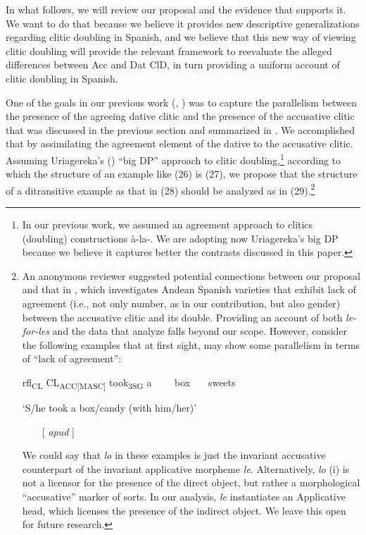\documentclass[output=paper,colorlinks,citecolor=brown,
]{langscibook}
\begin{document}
In what follows, we will review our proposal and the evidence that supports it. We want to do that because we believe it provides new descriptive generalizations regarding clitic doubling in Spanish, and we believe that this new way of viewing clitic doubling will provide the relevant framework to reevaluate the alleged differences between Acc and Dat ClD, in turn providing a uniform account of clitic doubling in Spanish.

One of the goals in our previous work (\citeyear{ausin2017}, \citeyear{ausin2021}) was to capture the parallelism between the presence of the agreeing dative clitic and the presence of the accusative clitic that was discussed in the previous section and summarized in . We accomplished that by assimilating the agreement element of the dative to the accusative clitic. Assuming Uriagereka’s (\citeyear{uriagereka1995}) “big DP” approach to clitic doubling,\footnote{\textrm{ In our previous work, we assumed an agreement approach to clitics (doubling) constructions à-la-\citet{suñer1988}. We are adopting now Uriagereka’s big DP because we believe it captures better the contrasts discussed in this paper.}} according to which the structure of an example like (26) is (27), we propose that the structure of a ditransitive example as that in (28) should be analyzed as in (29).\footnote{\textrm{ An anonymous reviewer suggested potential connections between our proposal and that in \citet{zdrojewski2014}, which investigates Andean Spanish varieties that exhibit lack of agreement (i.e., not only number, as in our contribution, but also gender) between the accusative clitic and its double. Providing an account of both }\textrm{\textit{le-for-les}}\textrm{ and the data that \citet{zdrojewski2014} analyze falls beyond our scope. However, consider the following examples that at first sight, may show some parallelism in terms of “lack of agreement”:}\par 




\textrm{rfl}\textrm{\textsubscript{CL }}\textrm{CL}\textrm{\textsubscript{ACC[MASC] }}\textrm{took}\textrm{\textsubscript{3SG}}\textrm{ a \ \ \ \ box \ \ \ sweets}\par \textrm{‘S/he took a box/candy (with him/her)’ \ }\par \textrm{\ \ \ \ [\citet{lujan1987} }\textrm{\textit{apud}}\textrm{ \citet{zdrojewski2014}]}\par \textrm{We could say that }\textrm{\textit{lo}}\textrm{ in these examples is just the invariant accusative counterpart of the invariant applicative morpheme }\textrm{\textit{le}}\textrm{. Alternatively, }\textrm{\textit{lo }}\textrm{(i) is not a licensor for the presence of the direct object, but rather a morphological “accusative” marker of sorts. In our analysis, }\textrm{\textit{le }}\textrm{instantiates an Applicative head, which licenses the presence of the indirect object. We leave this open for future research.}}
\end{document}
